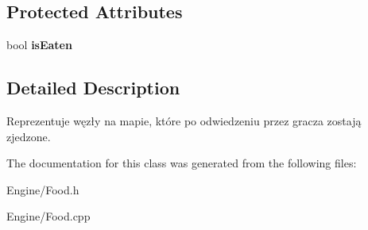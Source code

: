 \subsection*{Protected Attributes}
\begin{DoxyCompactItemize}
\item 
\mbox{\label{classFood_a23c6b5d2c4106865a631ef0c9381e36d}} 
bool {\bfseries is\+Eaten}
\end{DoxyCompactItemize}


\subsection{Detailed Description}
Reprezentuje węzły na mapie, które po odwiedzeniu przez gracza zostają \textquotesingle{}zjedzone\textquotesingle{}. 

The documentation for this class was generated from the following files\+:\begin{DoxyCompactItemize}
\item 
Engine/Food.\+h\item 
Engine/Food.\+cpp\end{DoxyCompactItemize}

